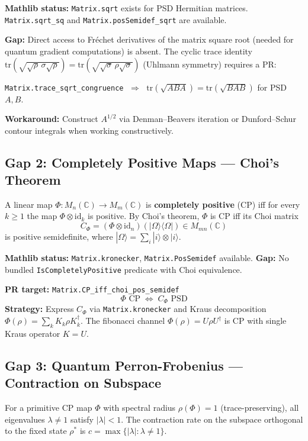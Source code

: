 \documentclass[12pt, letterpaper]{article}
\theoremstyle{plain}
\theoremstyle{definition}
\theoremstyle{remark}
\begin{document}
\textbf{Mathlib status:} \texttt{Matrix.sqrt} exists for PSD Hermitian matrices.
\texttt{Matrix.sqrt\_sq} and \texttt{Matrix.posSemidef\_sqrt} are available.

\textbf{Gap:} Direct access to Fréchet derivatives of the matrix square root
(needed for quantum gradient computations) is absent.
The cyclic trace identity $\mathrm{tr}(\sqrt{\sqrt{\rho}\,\sigma\sqrt{\rho}}) = \mathrm{tr}(\sqrt{\sqrt{\sigma}\,\rho\sqrt{\sigma}})$
(Uhlmann symmetry) requires a PR:
\begin{center}
\texttt{Matrix.trace\_sqrt\_congruence} $\;\Longrightarrow\;$
$\mathrm{tr}(\sqrt{ABA}) = \mathrm{tr}(\sqrt{BAB})$ for PSD $A, B$.
\end{center}

\textbf{Workaround:} Construct $A^{1/2}$ via Denman--Beavers iteration or
Dunford--Schur contour integrals when working constructively.

\subsection{Gap 2: Completely Positive Maps — Choi's Theorem}

A linear map $\Phi: M_n(\mathbb{C}) \to M_m(\mathbb{C})$ is \textbf{completely positive} (CP)
iff for every $k \geq 1$ the map $\Phi \otimes \mathrm{id}_k$ is positive.
By Choi's theorem, $\Phi$ is CP iff its Choi matrix
\[
  C_\Phi = (\Phi \otimes \mathrm{id}_n)(|\Omega\rangle\langle\Omega|) \in M_{mn}(\mathbb{C})
\]
is positive semidefinite, where $|\Omega\rangle = \sum_i |i\rangle \otimes |i\rangle$.

\textbf{Mathlib status:} \texttt{Matrix.kronecker}, \texttt{Matrix.PosSemidef} available.
\textbf{Gap:} No bundled \texttt{IsCompletelyPositive} predicate with Choi equivalence.

\textbf{PR target:} \texttt{Matrix.CP\_iff\_choi\_pos\_semidef}
\[
  \Phi \text{ CP} \;\Longleftrightarrow\; C_\Phi \text{ PSD}
\]
\textbf{Strategy:} Express $C_\Phi$ via \texttt{Matrix.kronecker} and
Kraus decomposition $\Phi(\rho) = \sum_k K_k \rho K_k^\dagger$.
The fibonacci channel $\Phi(\rho) = U\rho U^\dagger$ is CP with single Kraus operator $K = U$.

\subsection{Gap 3: Quantum Perron-Frobenius — Contraction on Subspace}

For a primitive CP map $\Phi$ with spectral radius $\rho(\Phi) = 1$ (trace-preserving),
all eigenvalues $\lambda \neq 1$ satisfy $|\lambda| < 1$. The contraction rate on the
subspace orthogonal to the fixed state $\rho^*$ is $c = \max\{|\lambda| : \lambda \neq 1\}$.
\end{document}
